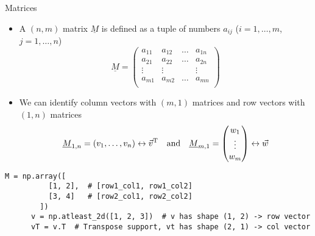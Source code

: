   \begin{frame}[fragile]{Matrices}
    \begin{itemize}
      \item A $(n, m)$ matrix $\underline{M}$ is defined as a tuple of numbers
        $a_{ij}$ ($i=1,\dots,m$, $j=1,\dots,n$)
        \begin{equation*}
          \underline{M} =
          \begin{pmatrix}
            a_{11} & a_{12} & \dots & a_{1n} \\
            a_{21} & a_{22} & \dots & a_{2n} \\
            \vdots & \vdots & & \vdots \\
            a_{m1} & a_{m2} & \dots & a_{mn} \\
          \end{pmatrix}
        \end{equation*}
      \item We can identify column vectors with $(m, 1)$ matrices and row
        vectors with $(1, n)$ matrices
        \begin{equation*}
          \underline{M}_{1,n} = \left(v_1, \dots, v_n\right)
            \leftrightarrow \vec{v}^{\text{T}} \quad\text{and}\quad
          \underline{M}_{m, 1} =
            \begin{pmatrix}w_1 \\ \vdots \\ w_m \end{pmatrix}
            \leftrightarrow \vec{w}
        \end{equation*}
    \end{itemize}
    \begin{mdframed}
      \begin{lstlisting}[style=dark, gobble=6, title=\lsttitlelight{Matrices in numpy -- Examples for presented content}]
      M = np.array([
          [1, 2],  # [row1_col1, row1_col2]
          [3, 4]   # [row2_col1, row2_col2]
        ])
      v = np.atleast_2d([1, 2, 3])  # v has shape (1, 2) -> row vector
      vT = v.T  # Transpose support, vt has shape (2, 1) -> col vector
      \end{lstlisting}
    \end{mdframed}
  \end{frame}

